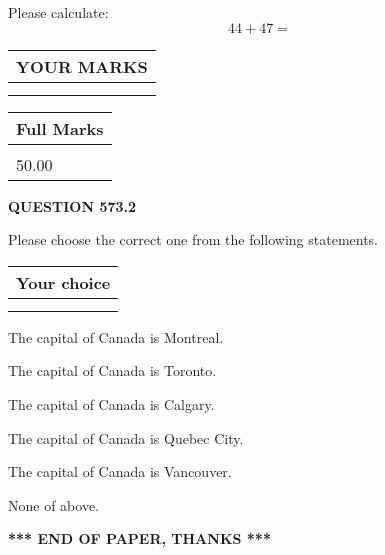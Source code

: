 \documentclass[12pt]{article}
\begin{document}
  
 
Please calculate:
\begin{equation}
44 +  %
47 = \nonumber
\end{equation}
 

 

 
  
\vspace{0.2in}
  
\noindent\begin{tabular}{|l|}
\hline
 YOUR MARKS  \\
\hline
 \\ 
 \\ 
\hline
\end{tabular}
\hspace{0.05in} \begin{tabular}{|l|}
\hline
 Full Marks  \\
\hline
 \\ 
50.00 \\
\hline
\end{tabular}
{\textbf{\Large{QUESTION
573.2 
}}}
  
  
Please choose the correct one from the following statements.
  
  
\noindent\hspace{3.0in} \begin{tabular}{|l|}
\hline
Your choice \\
\hline
 \\ 
 \\ 
\hline
\end{tabular}
  
  
 
 
The capital of Canada is Montreal.
 
 
The capital of Canada is Toronto.
 
 
The capital of Canada is Calgary.
 
 
The capital of Canada is Quebec City.
 
 
The capital of Canada is Vancouver.
 
 
 None of above.
 
 
   
   
 \vspace{0.2in}
 
   
   
   
   
\vspace{1.0in} 
{\textbf{\large{ *** END OF PAPER, THANKS *** }}} 
   
\end{document}
